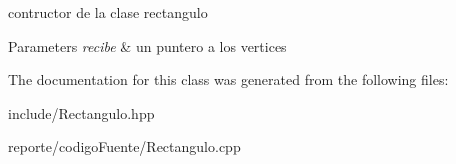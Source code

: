 contructor de la clase rectangulo 


\begin{DoxyParams}{Parameters}
{\em recibe} & un puntero a los vertices \\
\hline
\end{DoxyParams}


The documentation for this class was generated from the following files\+:\begin{DoxyCompactItemize}
\item 
include/Rectangulo.\+hpp\item 
reporte/codigo\+Fuente/Rectangulo.\+cpp\end{DoxyCompactItemize}
